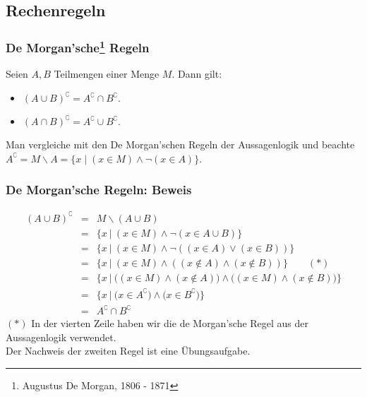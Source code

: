 \subsection{Rechenregeln}
%
\begin{frame}\frametitle{De Morgan'sche\footnote{Augustus De Morgan, 1806 - 1871} Regeln}
	
	Seien $A,B$ Teilmengen einer Menge $M$. Dann gilt:
	\begin{itemize}
		\item[(1)] $(A \cup B)^\complement = A^\complement \cap B^\complement.$
		\item[(2)] $(A \cap B)^\complement = A^\complement \cup B^\complement.$
	\end{itemize}
	\vfill
	 Man vergleiche mit den De Morgan'schen Regeln der Aussagenlogik und beachte $A^\complement = M\backslash A = \{x\mid (x\in M) \land \neg (x \in A)\}$.
\end{frame}
%
%
\begin{frame}\frametitle{De Morgan'sche Regeln: Beweis}
	
	\vspace{-3mm}
	\begin{eqnarray*}
		(A \cup B)^\complement  	&=& M \backslash (A\cup B) \\
						&=& \{x ~|~ (x\in M) \land \neg(x \in A\cup B) \}\\
						&=& \{x ~|~ (x\in M) \land \neg( (x \in A) \lor (x\in B) ) \}\\
						&=& \{x ~|~ (x\in M) \land ( (x \notin A) \land (x \notin B) ) \}	\qquad (*)\\ 		
						&=& \{x ~|~ \big((x\in M) \land (x \notin A)\big) \land \big( (x \in M) \land (x \notin B) \big) \}	\\
						&=& \{x ~|~ \big( x\in A^\complement \big) \land \big( x\in B^\complement \big) \}\\
						&=& A^\complement \cap B^\complement
	\end{eqnarray*}
	$(*)$ In der vierten Zeile haben wir die de Morgan'sche Regel aus der Aussagenlogik verwendet.\\
	\vfill \pause
	Der Nachweis der zweiten Regel ist eine \"Ubungsaufgabe.
	
\end{frame}
%
%

